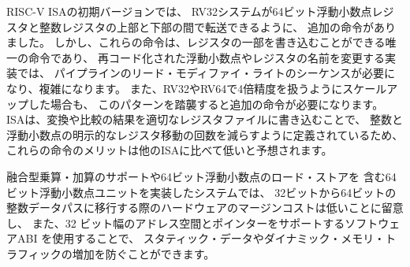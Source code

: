 \begin{commentary}
\begin{comment}
  Early versions of the RISC-V ISA had additional instructions to
  allow RV32 systems to transfer between the upper and lower portions
  of a 64-bit floating-point register and an integer register.
  However, these would be the only instructions with partial register
  writes and would add complexity in implementations with recoded
  floating-point or register renaming, requiring a pipeline read-modify-write
  sequence.  Scaling up to handling quad-precision for RV32 and RV64
  would also require additional instructions if they were to follow
  this pattern.  The ISA was defined to reduce the number of explicit
  int-float register moves, by having conversions and comparisons
  write results to the appropriate register file, so we expect the
  benefit of these instructions to be lower than for other ISAs.
\end{comment}

RISC-V ISAの初期バージョンでは、
RV32システムが64ビット浮動小数点レジスタと整数レジスタの上部と下部の間で転送できるように、
追加の命令がありました。
しかし、これらの命令は、レジスタの一部を書き込むことができる唯一の命令であり、
再コード化された浮動小数点やレジスタの名前を変更する実装では、
パイプラインのリード・モディファイ・ライトのシーケンスが必要になり、複雑になります。 
また、RV32やRV64で4倍精度を扱うようにスケールアップした場合も、
このパターンを踏襲すると追加の命令が必要になります。 
ISAは、変換や比較の結果を適切なレジスタファイルに書き込むことで、
整数と浮動小数点の明示的なレジスタ移動の回数を減らすように定義されているため、
これらの命令のメリットは他のISAに比べて低いと予想されます。

\begin{comment}
  We note that for systems that implement a 64-bit floating-point unit
  including fused multiply-add support and 64-bit floating-point loads
  and stores, the marginal hardware cost of moving from a 32-bit to
  a 64-bit integer datapath is low, and a software ABI supporting 32-bit
  wide address-space and pointers can be used to avoid growth of
  static data and dynamic memory traffic.
\end{comment}
融合型乗算・加算のサポートや64ビット浮動小数点のロード・ストアを
含む64ビット浮動小数点ユニットを実装したシステムでは、
32ビットから64ビットの整数データパスに移行する際のハードウェアのマージンコストは低いことに留意し、
また、32 ビット幅のアドレス空間とポインターをサポートするソフトウェアABI を使用することで、
スタティック・データやダイナミック・メモリ・トラフィックの増加を防ぐことができます。
\end{commentary}

